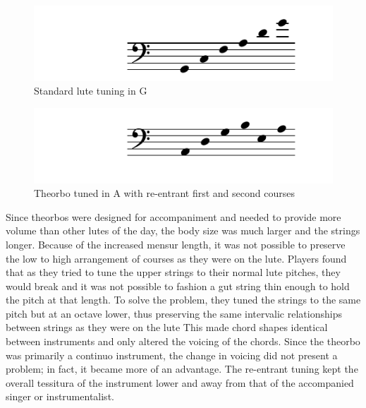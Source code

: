 \begin{figure}[h]
\centering
\includegraphics{examples/lute-tuning.pdf}
\caption{Standard lute tuning in G}
\label{g-lute}
\end{figure}
\begin{figure}[h]
\centering
\includegraphics{examples/theorbo-tuning.pdf}
\caption{Theorbo tuned in A with re-entrant first and second courses}
\label{a-theorbo}
\end{figure}

Since theorbos were designed for accompaniment and needed to provide more volume than other lutes of
the day, the body size was much larger and the strings longer. Because of the increased mensur
length, it was not possible to preserve the low to high arrangement of courses as they were on the
lute. Players found that as they tried to tune the upper strings to their normal lute pitches, they
would break and it was not possible to fashion a gut string thin enough to hold the pitch at that
length.  To solve the problem, they tuned the strings to the same pitch but at an octave lower, thus
preserving the same intervalic relationships between strings as they were on the lute  This made
chord shapes identical between instruments and only altered the voicing of the chords. Since the
theorbo was primarily a continuo instrument, the change in voicing did not present a problem; in
fact, it became more of an advantage.  The re-entrant tuning kept the overall tessitura of the
instrument lower and away from that of the accompanied singer or instrumentalist.

